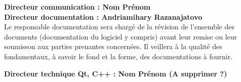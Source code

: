 \textbf{Directeur communication : Nom Prénom} \\
                    
\textbf{Directeur documentation : Andriamihary Razanajatovo} \\
Le responsable documentation sera chargé de la révision de l'ensemble des documents (documentation du logiciel y compris) avant leur remise ou leur soumisson aux parties prenantes concernées. Il veillera à la qualité des fondamentaux, à savoir le fond et la forme, des documentations à fournir. 

\textbf{Directeur technique Qt, C++ : Nom Prénom (A supprimer ?)} \\

                    
                    
                    

